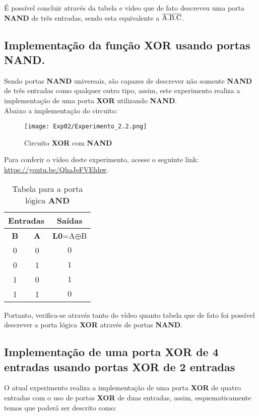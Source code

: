 \documentclass[12pt]{article}
\begin{document}
É possível concluir através da tabela e vídeo que de fato descreveu uma porta \textbf{NAND} de três entradas, sendo esta equivalente a $\overline{\rm A.B.C}$.
\\[2em]

\subsection{Implementação da função \textbf{XOR} usando portas \textbf{NAND}.}\label{sec:and_e_or}

Sendo portas \textbf{NAND} universais, são capazes de descrever não somente \textbf{NAND} de três entradas como qualquer outro tipo, assim, este experimento realiza a implementação de uma porta \textbf{XOR} utilizando \textbf{NAND}.\\
Abaixo a implementação do circuito:
\begin{figure}[H]
    \centering
    \texttt{[image: Exp02/Experimento\_2.2.png]}
    \caption{Circuito \textbf{XOR} com \textbf{NAND}}\label{fig:Esquema_Experimento2_2.2}
\end{figure}
Para conferir o vídeo deste experimento, acesse o seguinte link:
\href{https://youtu.be/QhaJeFVEhhw}{https://youtu.be/QhaJeFVEhhw}.

\begin{table}[H]
    \centering
    \caption{Tabela para a porta lógica \textbf{AND}}
    \begin{tabular}{|c|c|c|}
    \hline
        \multicolumn{2}{|c|}{Entradas} & \multicolumn{1}{c|}{Saídas}\\
    \hline
    \textbf{B} & \textbf{A} & \textbf{L0}=A$\oplus$B \\
    \hline
    0  & 0 & \(0\) \\
    \hline
    0  & 1 & \(1\) \\
    \hline
    1  & 0 & \(1\) \\
    \hline
    1  & 1 & \(0\) \\
    \hline
    \end{tabular}\label{tab:tabela_and}
\end{table}

Portanto, verifica-se através tanto do vídeo quanto tabela que de fato foi possível descrever a porta lógica \textbf{XOR} através de portas \textbf{NAND}.\\[2em]

\subsection{Implementação de uma porta \textbf{XOR} de 4 entradas usando portas \textbf{XOR} de 2 entradas}
O atual experimento realiza a implementação de uma porta \textbf{XOR} de quatro entradas com o uso de portas \textbf{XOR} de duas entradas, assim, esquematicamente temos que poderá ser descrito como:
\end{document}
